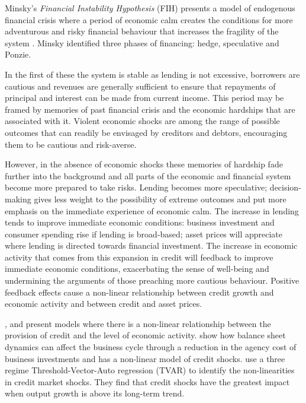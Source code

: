 \documentclass[12pt, a4paper, oneside]{article} %
\begin{document}
Minsky's \emph{Financial Instability Hypothesis} (FIH) presents a model of endogenous financial crisis where a period of economic calm creates the conditions for more adventurous and risky financial behaviour that increases the fragility of the system \citet{MinskyStabilising, MinskyKeynes, MinskyFIH, MinskyLongerWaves}.  Minsky identified three phases of financing:  hedge, speculative and Ponzie.  

In the first of these the system is stable as lending is not excessive, borrowers are cautious and revenues are generally sufficient to ensure that repayments of principal and interest can be made from current income.  This period may be framed by memories of past financial crisis and the economic hardships that are associated with it.  Violent economic shocks are among the range of possible outcomes that can readily be envisaged by creditors and debtors, encouraging them to be cautious and risk-averse. 

However, in the absence of economic shocks these memories of hardship fade further into the background and all parts of the economic and financial system become more prepared to take risks.  Lending becomes more speculative; decision-making gives less weight to the possibility of extreme outcomes and put more emphasis on the immediate experience of economic calm.  The increase in lending tends to improve immediate economic conditions:  business investment and consumer spending rise if lending is broad-based; asset prices will appreciate where lending is directed towards financial investment.  The increase in economic activity that comes from this expansion in credit will feedback to improve immediate economic conditions, exacerbating the sense of well-being and undermining the arguments of those preaching more cautious behaviour.  Positive feedback effects cause a non-linear relationship between credit growth and economic activity and between credit and asset prices. 

\citet{BernankeGertler}, \citet{Bernanke1999chapter} and \citet{Azaraidis} present models where there is a non-linear relationship between  the provision of credit and the level of economic activity. \citet{BernankeGertlerAgency} show how balance sheet dynamics can affect the business cycle through a reduction in the agency cost of business investments and \citet{Balke} has a non-linear model of credit shocks.  \citet{Avdjiev2014} use a three regime Threshold-Vector-Auto regression (TVAR) to identify the non-linearities in credit market shocks.  They find that credit shocks have the greatest impact when output growth is above its long-term trend. 
\end{document}
